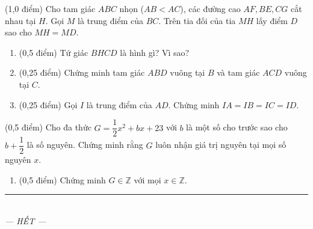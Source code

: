 \documentclass[12pt,a4paper]{article}
\begin{document}
\begin{ex} (1,0 điểm)
Cho tam giác $ABC$ nhọn ($AB < AC$), các đường cao $AF, BE, CG$ cắt nhau tại $H$. Gọi $M$ là trung điểm của $BC$. Trên tia đối của tia $MH$ lấy điểm $D$ sao cho $MH = MD$.
\begin{center}
\end{center}
\begin{enumerate}[label=\textbf{\alph*)}, leftmargin=0.8cm, itemsep=2pt]
\item (0,5 điểm) Tứ giác $BHCD$ là hình gì? Vì sao?
\item (0,25 điểm) Chứng minh tam giác $ABD$ vuông tại $B$ và tam giác $ACD$ vuông tại $C$.
\item (0,25 điểm) Gọi $I$ là trung điểm của $AD$. Chứng minh $IA = IB = IC = ID$.
\end{enumerate}
\end{ex}
\vspace{0.5mm}

\begin{ex} (0,5 điểm)
Cho đa thức $G = \dfrac{1}{2}x^2 + bx + 23$ với $b$ là một số cho trước sao cho $b + \dfrac{1}{2}$ là số nguyên. Chứng minh rằng $G$ luôn nhận giá trị nguyên tại mọi số nguyên $x$.
\begin{enumerate}[label=\textbf{\alph*)}, leftmargin=0.8cm, itemsep=2pt]
\item (0,5 điểm) Chứng minh $G \in \mathbb{Z}$ với mọi $x \in \mathbb{Z}$.
\end{enumerate}
\end{ex}
\vspace{0.5mm}


\begin{center}
\rule{4cm}{0.4pt}\\
\textit{--- HẾT ---}
\end{center}
\end{document}
